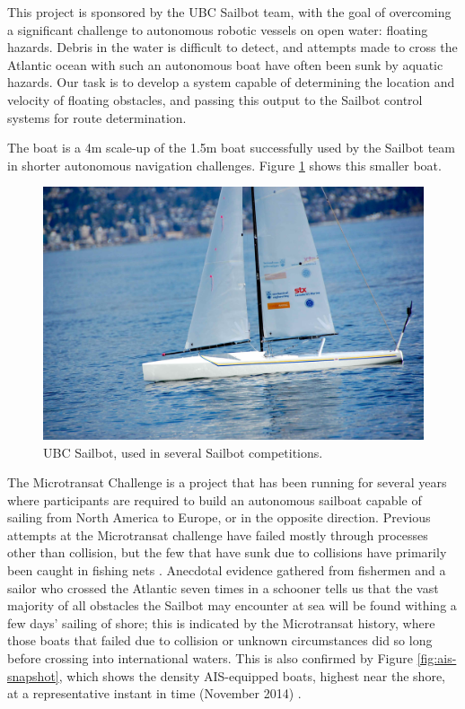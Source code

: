 This project is sponsored by the UBC Sailbot team, with the goal of overcoming a significant challenge to autonomous robotic vessels on open water: floating hazards. Debris in the water is difficult to detect, and attempts made to cross the Atlantic ocean with such an autonomous boat have often been sunk by aquatic hazards. Our task is to develop a system capable of determining the location and velocity of floating obstacles, and passing this output to the Sailbot control systems for route determination.

The boat is a 4m scale-up of the 1.5m boat successfully used by the Sailbot team in shorter autonomous navigation challenges. Figure \ref{fig:sailbot} shows this smaller boat.

\begin{figure}
\includegraphics[width=120mm,natwidth=1203,natheight=627]{"./image/sailbot"}
\caption[UBC Sailbot.]{\label{fig:sailbot}UBC Sailbot, used in several Sailbot competitions. \cite{ubc-sailbot__image}}
\end{figure}

The Microtransat Challenge \cite{transat-history} is a project that has been running for several years where participants are required to build an autonomous sailboat capable of sailing from North America to Europe, or in the opposite direction. Previous attempts at the Microtransat challenge have failed mostly through processes other than collision, but the few that have sunk due to collisions have primarily been caught in fishing nets \cite{transat-history}. Anecdotal evidence gathered from fishermen and a sailor who crossed the Atlantic seven times in a schooner tells us that the vast majority of all obstacles the Sailbot may encounter at sea will be found withing a few days' sailing of shore; this is indicated by the Microtransat history, where those boats that failed due to collision or unknown circumstances did so long before crossing into international waters. This is also confirmed by Figure \ref{fig:ais-snapshot}, which shows the density AIS-equipped boats, highest near the shore, at a representative instant in time (November 2014) \cite{marine-traffic}.

